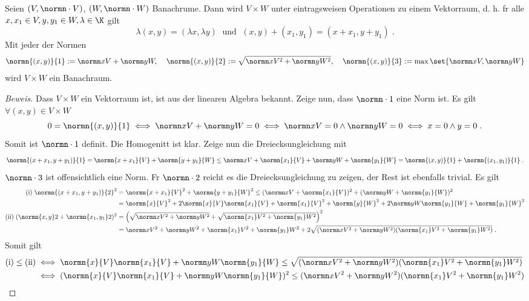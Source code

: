 \begin{theorem}
\begin{theorem}
	Seien \((V,\normn\cdot V)\), \((W,\normn\cdot W)\) Banachr\as ume. Dann wird \(V \times W\) unter eintragsweisen Operationen zu einem Vektorraum, d. h. 
	f\us r alle \( x,x_1\in V, y,y_1 \in W, \lambda \in \K\) gilt
	\[ \lambda(x, y) = (\lambda x, \lambda y) \;\text{ und }\;(x, y) + (x_1, y_1) = (x + x_1 , y+ y_1 )\;.\] 
	Mit jeder der Normen
	\[\normn{(x,y)}{1} := \normn xV + \normn yW ,\;\;\;\; \normn{(x,y)}{2} := \sqrt{\normn xV ^2 + \normn yW ^2},\;\;\;\; \normn{(x,y)}{3} := \max\set{\normn xV, \normn yW}\]
	wird \(V\times W\) ein Banachraum.
\end{theorem}
\begin{proof}[Beweis]
	Dass \(V\times W\) ein Vektorraum ist, ist aus der linearen Algebra bekannt. Zeige nun, dass \(\normn\cdot 1\) eine Norm ist. Es gilt \(\forall (x,y)\in V\times W\)
	\[0 = \normn{(x,y)}{1} \iff \normn xV + \normn yW = 0 \iff \normn xV = 0 \land \normn yW = 0 \iff x = 0 \land y = 0\;.\]
	Somit ist \(\normn\cdot 1\) definit. Die Homogenit\as t ist klar. Zeige nun die Dreiecksungleichung mit  
	\[\normn{(x + x_1, y+ y_1 )}{1} = \normn{x+ x_1}{V} + \normn{y+y_1}{W} \leq \normn xV + \normn{x_1}{V} + \normn yW + \normn{y_1}{W} = \normn{(x,y)}{1} + \normn{(x_1, y_1)}{1}\;.\]
	\(\normn\cdot 3\) ist offensichtlich eine Norm. F\us r \(\normn \cdot 2\) reicht es die Dreiecksungleichung zu zeigen, der Rest ist ebenfalls trivial. Es gilt
	\begin{align*} 
	\text{(i)}\;\normn{(x+x_1,y+y_1)}{2}^2& = \normn{x + x_1}{V}^2 + \normn{y + y_1}{W}^2 \leq (\normn xV + \normn{x_1}{V})^2 + (\normn yW  + \normn{y_1}{W})^2 \\
	&= \normn{x}{V}^2 + 2 \normn{x}{V}\normn{x_1}{V} + \normn{x_1}{V}^2 + \normn{y}{W}^2 + 2\normn yW \normn{y_1}{W} + \normn{y_1}{W}^2 \\
	\text{(ii)}\;(\normn{x,y}2 + \normn{x_1,y_1}2)^2 & = \left( \sqrt{\normn xV^2 + \normn yW^2} + \sqrt{\normn{x_1}V^2 + \normn{y_1}W^2}\right)^2 \\
	&= \normn xV^2 + \normn yW^2	 + \normn{x_1}V^2 + \normn{y_1}W^2 + 2 \sqrt{(\normn xV^2 + \normn yW^2)(\normn{x_1}V^2 + \normn{y_1}W^2)} \;.
	\end{align*}
	Somit gilt 
	\begin{align*}
	\text{(i)} \leq \text{(ii)} &\iff\normn{x}{V}\normn{x_1}{V} + \normn yW \normn{y_1}{W} \leq \sqrt{(\normn xV^2 + \normn yW^2)(\normn{x_1}V^2 + \normn{y_1}W^2)}  \\
	& \iff (\normn{x}{V}\normn{x_1}{V} + \normn yW \normn{y_1}{W})^2 \leq (\normn xV^2 + \normn yW^2)(\normn{x_1}V^2 + \normn{y_1}W^2) \\

\end{align*}
\end{proof}
\end{theorem}
